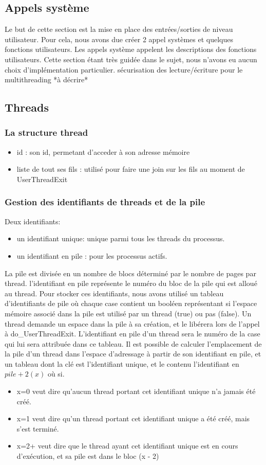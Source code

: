 \documentclass{article}
\begin{document}
	\subsection{Appels système}
	    {Le but de cette section est la mise en place des entrées/sorties de niveau utilisateur. Pour cela, nous avons due créer 2 appel systèmes et quelques fonctions utilisateurs. Les appels système appelent les descriptions des fonctions utilisateurs. Cette section étant très guidée dans le sujet, nous n'avons eu aucun choix d'implémentation particulier.
	    sécurisation des lecture/écriture pour le multithreading
		*à décrire*}
	\subsection{Threads}
		\subsubsection{La structure thread}
			\begin{itemize}
				\item id : son id, permetant d'acceder à son adresse mémoire
				\item liste de tout ses fils : utilisé pour faire une join sur les fils au moment de UserThreadExit
			\end{itemize}
		\subsubsection{Gestion des identifiants de threads et de la pile}
			{Deux identifiants:}
			\begin{itemize}
				\item{un identifiant unique: unique parmi tous les threads du processus.}
				\item{un identifiant en pile : pour les processus actifs.}
			\end{itemize}
			{La pile est divisée en un nombre de blocs déterminé par le nombre de pages par thread. l'identifiant en pile représente le numéro du bloc de la pile qui est alloué au thread. Pour stocker ces identifiants, nous avons utilisé un tableau d'identifiants de pile où chaque case contient un booléen représentant si l'espace mémoire associé dans la pile est utilisé par un thread (true) ou pas (false). }
			{Un thread demande un espace dans la pile à sa création, et le libérera lors de l'appel à do\_UserThreadExit. L'identifiant en pile d'un thread sera le numéro de la case qui lui sera attribuée dans ce tableau. Il est possible de calculer l'emplacement de la pile d'un thread dans l'espace d'adressage à partir de son identifiant en pile, et un tableau dont la clé est l'identifiant unique, et le contenu l'identifiant en $pile + 2 (x)$ où si.}
				\begin{itemize}
					\item{x=0 veut dire qu'aucun thread portant cet identifiant unique n'a jamais été créé.}
					\item{x=1 veut dire qu'un thread portant cet identifiant unique a été créé, mais s'est terminé.}
					\item{x=2+ veut dire que le thread ayant cet identifiant unique est en cours d'exécution, et sa pile est dans le bloc (x - 2)}
				\end{itemize}
\end{document}
